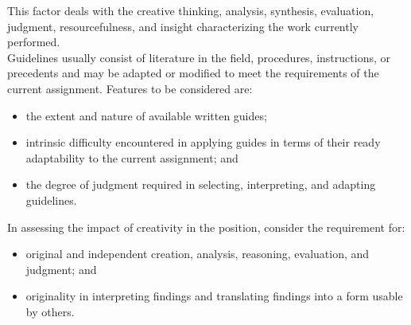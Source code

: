 
%

%
%
%

This factor deals with the creative thinking, analysis, synthesis,
evaluation, judgment, resourcefulness, and insight characterizing the
work currently performed.\\

Guidelines usually consist of literature in the field, procedures,
instructions, or precedents and may be adapted or modified to meet the
requirements of the current assignment.
Features to be considered are:
\begin{itemize}
\item the extent and nature of available written guides; 
\item intrinsic difficulty encountered in applying guides in terms of
  their ready adaptability to the current assignment; and
\item the degree of judgment required in selecting, interpreting, and
  adapting guidelines.
\end{itemize}
In assessing the impact of creativity in the position, consider the requirement for: 
\begin{itemize}
\item original and independent creation, analysis, reasoning,
  evaluation, and judgment; and
\item originality in interpreting findings and translating findings
  into a form usable by others.
\end{itemize}

